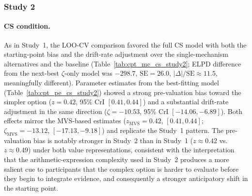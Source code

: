 \documentclass[man,floatsintext]{apa7}
\begin{document}
\FloatBarrier

\subsubsection{Study 2}

\paragraph{CS condition.} As in Study~1, the LOO-CV comparison favored the full CS model with both the starting-point bias and the drift-rate adjustment over the single-mechanism alternatives and the baseline (Table~\ref{tab:cpt_mc_cs_study2}; ELPD difference from the next-best $\zeta$-only model was $-298.7$, $\mathrm{SE} = 26.0$, $|\Delta|/\mathrm{SE} \approx 11.5$, meaningfully different). Parameter estimates from the best-fitting model (Table~\ref{tab:cpt_pe_cs_study2}) showed a strong pre-valuation bias toward the simpler option (\textbf{$z = 0.42$}, 95\% CrI $[0.41, 0.44]$) and a substantial drift-rate adjustment in the same direction (\textbf{$\zeta = -10.53$}, 95\% CrI $[-14.06, -6.89]$). Both effects mirror the MVS-based estimates ($z_{\text{MVS}} = 0.42$, $[0.41, 0.44]$; $\zeta_{\text{MVS}} = -13.12$, $[-17.13, -9.18]$) and replicate the Study~1 pattern. The pre-valuation bias is notably stronger in Study~2 than in Study~1 ($z \approx 0.42$ vs.\ $z \approx 0.49$) under both value representations, consistent with the interpretation that the arithmetic-expression complexity used in Study~2 produces a more salient cue to participants that the complex option is harder to evaluate before they begin to integrate evidence, and consequently a stronger anticipatory shift in the starting point.
\end{document}
